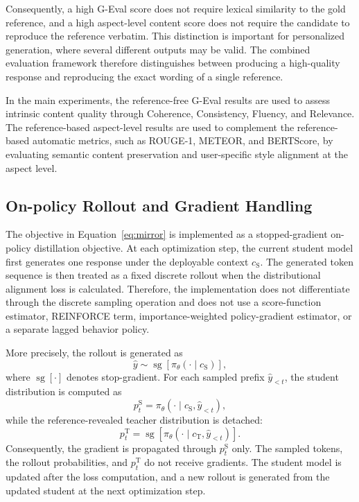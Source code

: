 \documentclass{article} %
\begin{document}
Consequently, a high G-Eval score does not require lexical similarity to the gold reference, and a high aspect-level content score does not require the candidate to reproduce the reference verbatim. This distinction is important for personalized generation, where several different outputs may be valid. The combined evaluation framework therefore distinguishes between producing a high-quality response and reproducing the exact wording of a single reference.

In the main experiments, the reference-free G-Eval results are used to assess intrinsic content quality through Coherence, Consistency, Fluency, and Relevance. The reference-based aspect-level results are used to complement the reference-based automatic metrics, such as ROUGE-1, METEOR, and BERTScore, by evaluating semantic content preservation and user-specific style alignment at the aspect level.

\subsection{On-policy Rollout and Gradient Handling}
\label{app:on_policy_gradient}

The objective in Equation~\ref{eq:mirror} is implemented as a
stopped-gradient on-policy distillation objective. At each optimization
step, the current student model first generates one response under the
deployable context $c_{\mathrm{S}}$. The generated token sequence is then
treated as a fixed discrete rollout when the distributional alignment loss
is calculated. Therefore, the implementation does not differentiate through
the discrete sampling operation and does not use a score-function estimator,
REINFORCE term, importance-weighted policy-gradient estimator, or a separate
lagged behavior policy.

More precisely, the rollout is generated as
\begin{equation}
    \hat{y}
    \sim
    \operatorname{sg}\!\left[
        \pi_{\theta}(\cdot\mid c_{\mathrm{S}})
    \right],
\end{equation}
where $\operatorname{sg}[\cdot]$ denotes stop-gradient. For each sampled
prefix $\hat{y}_{<t}$, the student distribution is computed as
\begin{equation}
    p_t^{\mathrm{S}}
    =
    \pi_{\theta}
    \left(
        \cdot\mid c_{\mathrm{S}},\hat{y}_{<t}
    \right),
\end{equation}
while the reference-revealed teacher distribution is detached:
\begin{equation}
    p_t^{\mathrm{T}}
    =
    \operatorname{sg}\!\left[
        \pi_{\theta}
        \left(
            \cdot\mid c_{\mathrm{T}},\hat{y}_{<t}
        \right)
    \right].
\end{equation}
Consequently, the gradient is propagated through $p_t^{\mathrm{S}}$ only.
The sampled tokens, the rollout probabilities, and $p_t^{\mathrm{T}}$ do not
receive gradients. The student model is updated after the loss computation,
and a new rollout is generated from the updated student at the next
optimization step.
\end{document}
